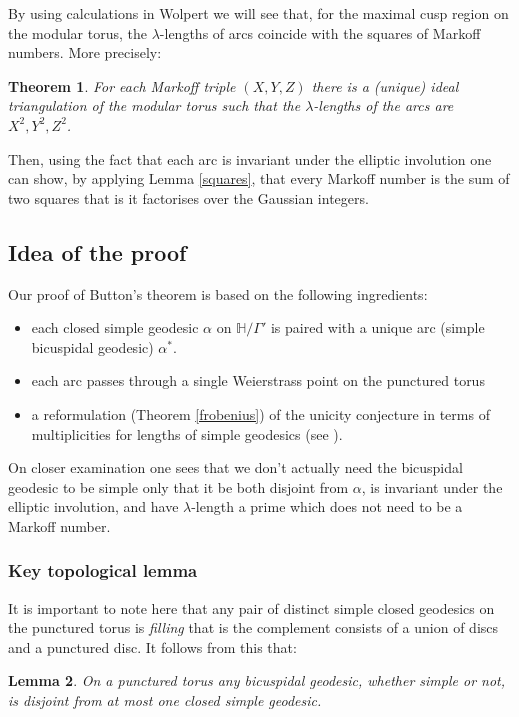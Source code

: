 \documentclass[12pt,a4paper]{amsart}
\newtheorem{thm}{Theorem}[section]
\newtheorem{lem}[thm]{Lemma}
\def\HH{\mathbb{H}}
\def\xx{\HH/\Gamma'}
\begin{document}
 By using calculations in Wolpert \cite{saw} we will see that, for the maximal
 cusp region on the modular torus,  the $\lambda$-lengths of arcs coincide with
 the squares of Markoff numbers. More precisely:
 
\begin{thm}\label{thm:triangulation lengths}
For each  Markoff triple $(X,Y,Z)$
there is a (unique) ideal triangulation of the modular torus
such that the $\lambda$-lengths of the arcs are 
$X^2,Y^2,Z^2$.
\end{thm}

 Then, using the fact that each arc is invariant under the elliptic involution
 one can show, by applying Lemma \ref{squares}, that every Markoff number is
 the sum of two squares that is it factorises over the Gaussian integers.

 \subsection{Idea of the proof}

Our proof of Button's theorem is based on the following ingredients: 
\begin{itemize}
\item each closed simple geodesic $\alpha$ on $\xx$ is paired with a unique arc (simple bicuspidal geodesic) $\alpha^*$. 
\item each arc passes through a single Weierstrass point on the punctured torus
\item a reformulation (Theorem \ref{frobenius}) of the unicity conjecture in terms of multiplicities for lengths of simple geodesics (see \cite{mcp}).
\end{itemize}


On closer examination one sees that we don't actually need the bicuspidal
geodesic to be simple only that it be both disjoint from $\alpha$,
is invariant under the elliptic involution, 
and have $\lambda$-length a prime which does not need to be a Markoff number. 

\subsubsection{Key topological lemma}
It is important to note here that any pair of
distinct simple closed geodesics on the punctured torus is \textit{filling}
that is the complement consists of a union of discs and a punctured disc. It
follows from this that:

\begin{lem}\label{lem: labelling}
On a punctured torus any bicuspidal geodesic, whether simple or not, is
disjoint from at most one closed simple geodesic.
\end{lem}
\end{document}
